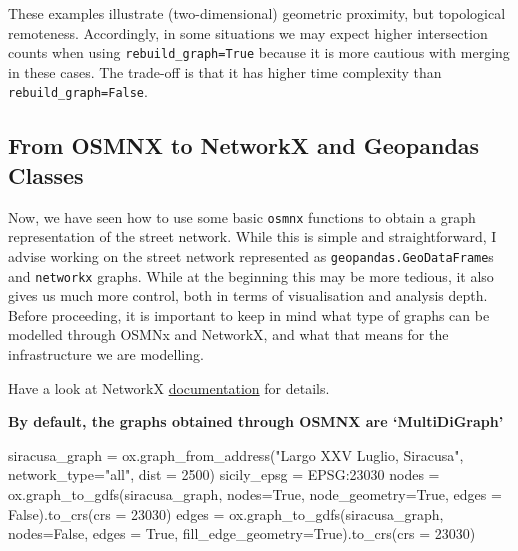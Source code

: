 \documentclass[
  letterpaper,
  DIV=11,
  numbers=noendperiod]{scrreprt}
\newenvironment{Shaded}{\begin{snugshade}}{\end{snugshade}}
\newcommand{\DecValTok}[1]{\textcolor[rgb]{0.68,0.00,0.00}{#1}}
\newcommand{\NormalTok}[1]{\textcolor[rgb]{0.00,0.23,0.31}{#1}}
\newcommand{\OperatorTok}[1]{\textcolor[rgb]{0.37,0.37,0.37}{#1}}
\newcommand{\StringTok}[1]{\textcolor[rgb]{0.13,0.47,0.30}{#1}}
\newcommand{\VariableTok}[1]{\textcolor[rgb]{0.07,0.07,0.07}{#1}}
\begin{document}
These examples illustrate (two-dimensional) geometric proximity, but
topological remoteness. Accordingly, in some situations we may expect
higher intersection counts when using \texttt{rebuild\_graph=True}
because it is more cautious with merging in these cases. The trade-off
is that it has higher time complexity than
\texttt{rebuild\_graph=False}.

\hypertarget{from-osmnx-to-networkx-and-geopandas-classes}{%
\subsection{From OSMNX to NetworkX and Geopandas
Classes}\label{from-osmnx-to-networkx-and-geopandas-classes}}

Now, we have seen how to use some basic \texttt{osmnx} functions to
obtain a graph representation of the street network. While this is
simple and straightforward, I advise working on the street network
represented as \texttt{geopandas.GeoDataFrame}s and \texttt{networkx}
graphs. While at the beginning this may be more tedious, it also gives
us much more control, both in terms of visualisation and analysis depth.
Before proceeding, it is important to keep in mind what type of graphs
can be modelled through OSMNx and NetworkX, and what that means for the
infrastructure we are modelling.

Have a look at NetworkX
\href{https://networkx.org/documentation/stable/reference/classes/index.html}{documentation}
for details.

\textbf{By default, the graphs obtained through OSMNX are
`MultiDiGraph'}

\begin{Shaded}
\begin{Highlighting}[]
\NormalTok{siracusa\_graph }\OperatorTok{=}\NormalTok{ ox.graph\_from\_address(}\StringTok{"Largo XXV Luglio, Siracusa"}\NormalTok{, network\_type}\OperatorTok{=}\StringTok{"all"}\NormalTok{, dist }\OperatorTok{=} \DecValTok{2500}\NormalTok{)}
\NormalTok{sicily\_epsg }\OperatorTok{=} \StringTok{\textquotesingle{}EPSG:23030\textquotesingle{}}
\NormalTok{nodes }\OperatorTok{=}\NormalTok{ ox.graph\_to\_gdfs(siracusa\_graph, nodes}\OperatorTok{=}\VariableTok{True}\NormalTok{, node\_geometry}\OperatorTok{=}\VariableTok{True}\NormalTok{, edges }\OperatorTok{=} \VariableTok{False}\NormalTok{).to\_crs(crs }\OperatorTok{=} \DecValTok{23030}\NormalTok{)}
\NormalTok{edges }\OperatorTok{=}\NormalTok{ ox.graph\_to\_gdfs(siracusa\_graph, nodes}\OperatorTok{=}\VariableTok{False}\NormalTok{, edges }\OperatorTok{=}  \VariableTok{True}\NormalTok{, fill\_edge\_geometry}\OperatorTok{=}\VariableTok{True}\NormalTok{).to\_crs(crs }\OperatorTok{=} \DecValTok{23030}\NormalTok{)}
\end{Highlighting}
\end{Shaded}
\end{document}
